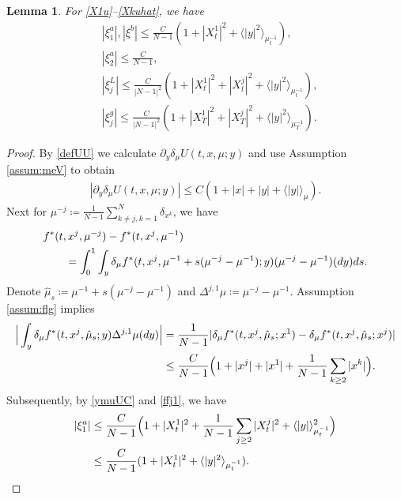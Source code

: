 \documentclass{amsart}
\newtheorem{lemma}[theorem]{Lemma}
\theoremstyle{definition}
\theoremstyle{remark}
\numberwithin{equation}{section}
\begin{document}
\begin{lemma}\label{lemma:xi}
 For \eqref{X1u}--\eqref{Xkuhat},
we have
\begin{align}
& |\xi^a_1 |, |\xi^b|\le \frac{C}{N-1} (1+|X_t^1|^2 +\langle|y|^2\rangle_{\mu_t^{-1}}  ),   \label{xia1b}  \\
& |\xi^a_2 |\le \frac{C}{N-1} ,  \label{xia2}   \\
&|\xi_j^L|\le \frac{C}{|N-1|^2} (1+|X^1_t|^2+|X_t^j|^2+\langle|y|^2\rangle_{\mu_t^{-1}}  ),\label{xiLj}  \\
&|\xi_j^g|\le \frac{C}{|N-1|^2} (1+|X^1_T|^2+|X_T^j|^2+\langle|y|^2\rangle_{\mu_T^{-1}} ).\label{xigj}
\end{align}

\end{lemma}

\begin{proof}
By \eqref{defUU} we calculate $\partial_y \delta_\mu U(t, x, \mu;y)$
and use Assumption \ref{assum:meV} to  obtain
\begin{align}
|\partial_y\delta_\mu U(t, x, \mu;y)|\le C(1+|x|+|y|+\langle|y|\rangle_\mu).
\label{ymuUC}
\end{align}
Next for $\mu^{-j}\coloneqq \frac{1}{N-1}\sum_{k\ne j, k=1}^N \delta_{x^k}$, we have
\begin{align}
&f^*(t, x^j, \mu^{-j})-f^*(t, x^j, \mu^{-1}) \label{ffj1}  \\
&\qquad =
\int_0^1 \int_y\delta_\mu f^*(t, x^j, \mu^{-1} +s(\mu^{-j}-\mu^{-1}) ;y) (\mu^{-j}-\mu^{-1}) (dy)ds. \notag
\end{align}
Denote $\hat \mu_s\coloneqq  \mu^{-1} +s(\mu^{-j}-\mu^{-1})$
and $\Delta^{j,1} \mu\coloneqq \mu^{-j}-\mu^{-1}  $.
  Assumption \ref{assum:flg} implies
\begin{align}
\Big|\int_y \delta_\mu f^*(t, x^j, \hat \mu_s;y)  \Delta^{j,1} \mu (dy)\Big| &=\frac{1}{N-1} |\delta_\mu f^*(t, x^j, \hat \mu_s;x^1)- \delta_\mu f^*(t, x^j, \hat \mu_s;x^j) | \notag \\
&\le \frac{C}{N-1} \Big(1+|x^j|+|x^1|+\frac{1}{N-1}\sum_{k\ge 2} |x^k|\Big).\notag
\end{align}
Subsequently, by \eqref{ymuUC} and \eqref{ffj1}, we have
\begin{align}
|\xi_1^a|&\le \frac{C}{N-1}\Big(1+|X_t^1|^2+\frac{1}{N-1}\sum_{j\ge 2}|X_t^j|^2+ \langle |y|\rangle^2_{\mu_t^{-1}}\Big)\\
&\le \frac{C}{N-1}(1+|X_t^1|^2+ \langle |y|^2\rangle_{\mu_t^{-1}}).\notag
\end{align}


\end{proof}
\end{document}
